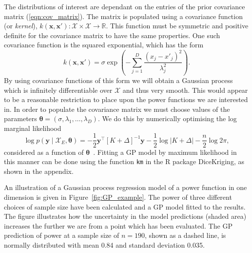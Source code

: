 \documentclass{article} %
\begin{document}
The distributions of interest are dependant on the entries of the prior covariance matrix (\ref{eqn:cov_matrix}). The matrix is populated using a covariance function (or \emph{kernel}), $k(\mathbf{x}, \mathbf{x}') : \mathcal{X} \times \mathcal{X} \rightarrow \mathbb{R}$. This function must be symmetric and positive definite for the covariance matrix to have the same properties. One such covariance function is the squared exponential, which has the form
\begin{equation}
k(\mathbf{x}, \mathbf{x}') = \sigma \exp \left( -\sum_{j=1}^{D} \frac{(x_{j} - x'_{j})^2}{\lambda_{j}^2} \right).
\end{equation}
By using covariance functions of this form we will obtain a Gaussian process which is infinitely differentiable over $\mathcal{X}$ and thus very smooth. This would appear to be a reasonable restriction to place upon the power functions we are interested in. In order to populate the covariance matrix we must choose values of the parameters $\boldsymbol{\theta} = (\sigma, \lambda_{1}, \ldots, \lambda_{D})$. We do this by numerically optimising the log marginal likelihood
\begin{equation}\label{eqn:loglik}
\log{p(\mathbf{y} \mid \mathcal{X}_{E}, \boldsymbol{\theta})} = -\frac{1}{2}\mathbf{y}^\top[K + \Delta]^{-1}\mathbf{y} - \frac{1}{2} \log{|K + \Delta|} - \frac{n}{2} \log{2\pi},
\end{equation}
considered as a function of $\boldsymbol{\theta}$~\cite{Rasmussen2006}. Fitting a GP model by maximum likelihood in this manner can be done using the function \texttt{km} in the R package DiceKriging, as shown in the appendix.

An illustration of a Gaussian process regression model of a power function in one dimension is given in Figure~\ref{fig:GP_example}. The power of three different choices of sample size have been calculated and a GP model fitted to the results. The figure illustrates how the uncertainty in the model predictions (shaded area) increases the further we are from a point which has been evaluated. The GP prediction of power at a sample size of $n = 190$, shown as a dashed line, is normally distributed with mean 0.84 and standard deviation 0.035.
\end{document}

